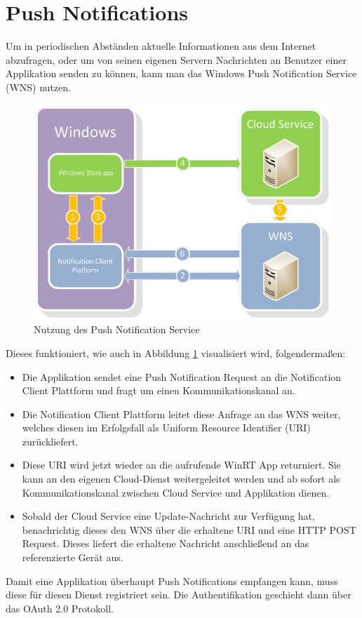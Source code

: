 \documentclass[a4paper,bibtotoc,oneside]{scrbook}
\begin{document}
\section[Push Notifications]{Push Notifications}\label{pushnots}
Um in periodischen Abständen aktuelle Informationen aus dem Internet abzufragen, oder um von seinen eigenen Servern Nachrichten an Benutzer einer Applikation senden zu können, kann man das Windows Push Notification Service (WNS) nutzen.
\begin{figure}[htbp]
\centering
\includegraphics[scale=0.8]{images/push.png}
\caption[Nutzung des Push Notification Service]{Nutzung des Push Notification Service}\label{img:push}
\end{figure}
\newline
Dieses funktioniert, wie auch in Abbildung \ref{img:push} visualisiert wird, folgendermaßen:
\begin{itemize}
\item Die Applikation sendet eine Push Notification Request an die Notification Client Plattform und fragt um einen Kommunikationskanal an.
\item Die Notification Client Plattform leitet diese Anfrage an das WNS weiter, welches diesen im Erfolgsfall als Uniform Resource Identifier (URI) zurückliefert.
\item Diese URI wird jetzt wieder an die aufrufende WinRT App returniert. Sie kann an den eigenen Cloud-Dienst weitergeleitet werden und ab sofort als Kommunikationskanal zwischen Cloud Service und Applikation dienen.
\item Sobald der Cloud Service eine Update-Nachricht zur Verfügung hat, benachrichtig dieses den WNS über die erhaltene URI und eine HTTP POST Request. Dieses liefert die erhaltene Nachricht anschließend an das referenzierte Gerät aus.
\end{itemize}
Damit eine Applikation überhaupt Push Notifications empfangen kann, muss diese für diesen Dienst registriert sein. Die Authentifikation geschieht dann über das OAuth 2.0 Protokoll. \cite{push12}
\end{document}
